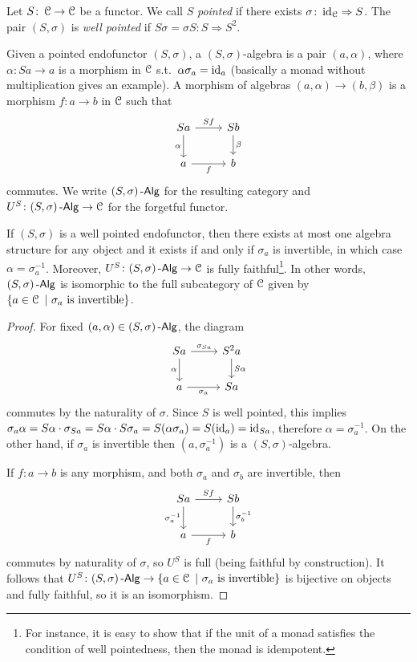 \documentclass[a4paper,11pt,oneside,openany]{scrbook}
\begin{document}
\begin{defn}
	Let $S\colon\operatorname{\mathcal{C}}\to\operatorname{\mathcal{C}}$ be a functor. We call $S$ \emph{pointed} if there exists $\sigma\colon\operatorname{id}_{\operatorname{\mathcal{C}}}\Rightarrow S$. The pair $(S,\sigma)$ is \emph{well pointed} if $S\sigma=\sigma S\colon S\Rightarrow S^2$.
\end{defn}
\begin{defn}
	Given a pointed endofunctor $(S,\sigma)$, a $(S,\sigma)$-algebra is a pair $(a,\alpha)$, where $\alpha\colon Sa\to a$ is a morphism in $\operatorname{\mathcal{C}}$ s.t.\ $\alpha\sigma_a=\operatorname{id}_a$ (basically a monad without multiplication gives an example). A morphism of algebras $(a,\alpha)\to(b,\beta)$ is a morphism $f\colon a\to b$ in $\operatorname{\mathcal{C}}$ such that
	\[
	\begin{tikzcd}
	Sa\arrow["\alpha"']{d}\arrow["Sf"]{r}
	& Sb\arrow["\beta"]{d} \\
	a\arrow["f"']{r}
	& b
	\end{tikzcd}
	\]
	commutes. We write $(S,\sigma)\operatorname{-\mathsf{Alg}}$ for the resulting category and $U^S\colon(S,\sigma)\operatorname{-\mathsf{Alg}}\to\operatorname{\mathcal{C}}$ for the forgetful functor.
\end{defn}
\begin{lemma}
	If $(S,\sigma)$ is a well pointed endofunctor, then there exists at most one algebra structure for any object and it exists if and only if $\sigma_a$ is invertible, in which case $\alpha=\sigma_a^{-1}$. Moreover, $U^S\colon(S,\sigma)\operatorname{-\mathsf{Alg}}\to\operatorname{\mathcal{C}}$ is fully faithful\footnote{For instance, it is easy to show that if the unit of a monad satisfies the condition of well pointedness, then the monad is idempotent.}. In other words, $(S,\sigma)\operatorname{-\mathsf{Alg}}$ is isomorphic to the full subcategory of $\operatorname{\mathcal{C}}$ given by $\{a\in\operatorname{\mathcal{C}}\ |\ \sigma_a \ \text{is invertible} \}$.
\end{lemma}
\begin{proof}
	For fixed $(a,\alpha)\in(S,\sigma)\operatorname{-\mathsf{Alg}}$, the diagram
	\[
	\begin{tikzcd}
	Sa\arrow["\alpha"']{d}\arrow["\sigma_{Sa}"]{r}
	& S^2a\arrow["S\alpha"]{d} \\
	a\arrow["\sigma_a"']{r}
	& Sa
	\end{tikzcd}
	\] 
	commutes by the naturality of $\sigma$. Since $S$ is well pointed, this implies $\sigma_a \alpha=S\alpha\cdot\sigma_{Sa}=S\alpha\cdot S\sigma_a=S(\alpha\sigma_a)=S(\operatorname{id}_a)=\operatorname{id}_{Sa}$, therefore $\alpha=\sigma_a^{-1}$. On the other hand, if $\sigma_a$ is invertible then $(a,\sigma_a^{-1})$ is a $(S,\sigma)$-algebra.
	
	If $f\colon a\to b$ is any morphism, and both $\sigma_a$ and $\sigma_b$ are invertible, then 
		\[
	\begin{tikzcd}
	Sa\arrow["\sigma_a^{-1}"']{d}\arrow["Sf"]{r}
	& Sb\arrow["\sigma_b^{-1}"]{d} \\
	a\arrow["f"']{r}
	& b
	\end{tikzcd}
	\] 
	commutes by naturality of $\sigma$, so $U^S$ is full (being faithful by construction). It follows that $U^S\colon(S,\sigma)\Alg\to\{a\in\C\ |\ \sigma_a \ \text{is invertible}\}$ is bijective on objects and fully faithful, so it is an isomorphism.
\end{proof}
\end{document}
